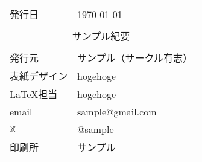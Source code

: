 \thispagestyle{empty}
\setlength{\arrayrulewidth}{1.2pt}
\hfill{}
\begin{tabularx}{7.5cm}{ll}
  \hline
  発行日 & \today \\%
     &  \\
  \multicolumn{2}{c}{\Large サンプル紀要}\\
  &  \\
  発行元 & サンプル（サークル有志） \\%
  表紙デザイン&hogehoge\\
  \LaTeX 担当&hogehoge\\
  email &{\small sample@gmail.com}\\
  $\mathbb{X}$ &@sample \\
  印刷所 &  サンプル\\%
  \hline
\end{tabularx}%